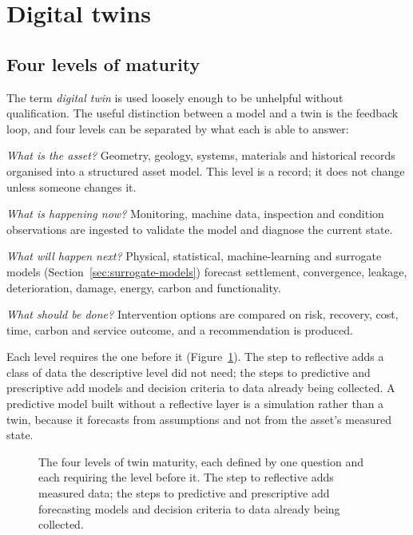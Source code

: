 \section{Digital twins}
\label{sec:digital-twins}

\subsection{Four levels of maturity}
\label{sec:twin-maturity}

The term \emph{digital twin} is used loosely enough to be unhelpful without
qualification. The useful distinction between a model and a twin is the
feedback loop, and four levels can be separated by what each is able to
answer:

\begin{description}[leftmargin=28mm,style=nextline]
 \item[Descriptive] \emph{What is the asset?} Geometry, geology, systems,
 materials and historical records organised into a structured asset model.
 This level is a record; it does not change unless someone changes it.
 \item[Reflective] \emph{What is happening now?} Monitoring, machine data,
 inspection and condition observations are ingested to validate the model
 and diagnose the current state.
 \item[Predictive] \emph{What will happen next?} Physical, statistical,
 machine-learning and surrogate models (Section~\ref{sec:surrogate-models})
 forecast settlement, convergence,
 leakage, deterioration, damage, energy, carbon and functionality.
 \item[Prescriptive] \emph{What should be done?} Intervention options are
 compared on risk, recovery, cost, time, carbon and service outcome, and a
 recommendation is produced.
\end{description}

Each level requires the one before it (Figure~\ref{fig:dt-maturity}). The step to reflective adds a class of
data the descriptive level did not need; the steps to predictive and
prescriptive add models and decision criteria to data already being
collected. A predictive model built without a reflective layer is a
simulation rather than a twin, because it forecasts from assumptions and not
from the asset's measured state.

\begin{figure}[htbp]
\centering
{}
\caption{The four levels of twin maturity, each defined by one question and
each requiring the level before it. The step to reflective adds measured
data; the steps to predictive and prescriptive add forecasting models and
decision criteria to data already being collected.}
\label{fig:dt-maturity}
\end{figure}

